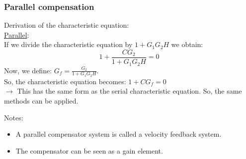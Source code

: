 \begin{frame}
	\frametitle{Parallel compensation}
	Derivation of the characteristic equation:\\
	\underline{Parallel}:\\
	If we divide the characteristic equation by $1+G_1G_2H$ we obtain: $$1+\frac{CG_2}{1+G_1G_2H}=0$$
	Now, we define: $G_f=\frac{G_2}{1+G_1G_2H}$.\\
	So, the characteristic equation becomes: $1+CG_f=0$\\
	$\rightarrow$ This has the same form as the serial characteristic equation. So, the same methods can be applied. 
	\vspace{2mm}
	
	Notes:
	\begin{itemize}
	\item A parallel compensator system is called a velocity feedback system.
	\item The compensator can be seen as a gain element.
	\end{itemize}
\end{frame}

